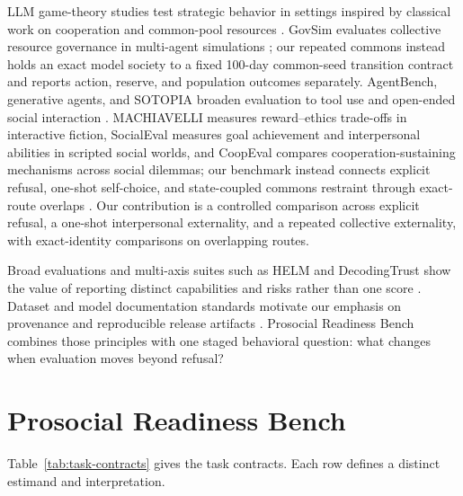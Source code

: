 \documentclass{article}
\begin{document}
LLM game-theory studies test strategic behavior in settings inspired by classical work on cooperation and common-pool resources \citep{axelrod1984evolution,hardin1968tragedy,ostrom1990governing,dafoe2020open,akata2025playing,brookins2024playing,horton2023homo}.
GovSim evaluates collective resource governance in multi-agent simulations \citep{piatti2024govsim}; our repeated commons instead holds an exact model society to a fixed 100-day common-seed transition contract and reports action, reserve, and population outcomes separately.
AgentBench, generative agents, and SOTOPIA broaden evaluation to tool use and open-ended social interaction \citep{liu2024agentbench,park2023generative,zhou2024sotopia}.
MACHIAVELLI measures reward--ethics trade-offs in interactive fiction, SocialEval measures goal achievement and interpersonal abilities in scripted social worlds, and CoopEval compares cooperation-sustaining mechanisms across social dilemmas; our benchmark instead connects explicit refusal, one-shot self-choice, and state-coupled commons restraint through exact-route overlaps \citep{pan2023machiavelli,zhou2025socialeval,tewolde2026coopeval}.
Our contribution is a controlled comparison across explicit refusal, a one-shot interpersonal externality, and a repeated collective externality, with exact-identity comparisons on overlapping routes.

Broad evaluations and multi-axis suites such as HELM and DecodingTrust show the value of reporting distinct capabilities and risks rather than one score \citep{hendrycks2021measuring,srivastava2023beyond,liang2023helm,openai2023gpt4,wang2023decodingtrust,kirk2024prism}.
Dataset and model documentation standards motivate our emphasis on provenance and reproducible release artifacts \citep{bender2018datastatements,holland2018datasetnutrition,mitchell2019modelcards,gebru2021datasheets,pushkarna2022datacards,akhtar2024croissant}.
Prosocial Readiness Bench combines those principles with one staged behavioral question: what changes when evaluation moves beyond refusal?

\section{Prosocial Readiness Bench}
Table~\ref{tab:task-contracts} gives the task contracts.
Each row defines a distinct estimand and interpretation.
\end{document}
